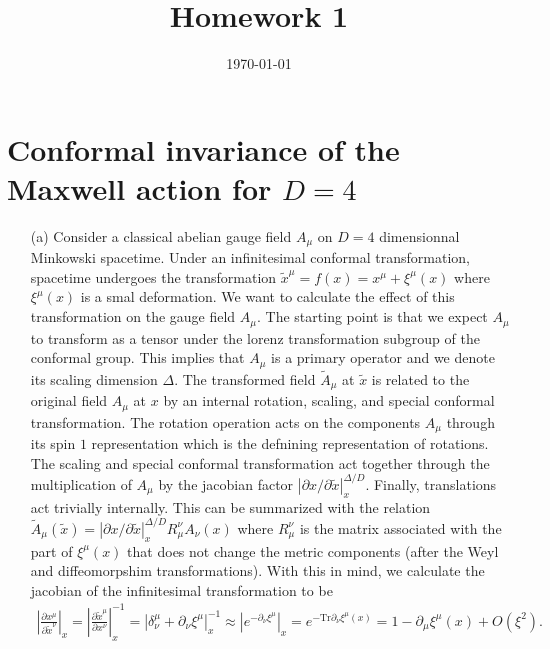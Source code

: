 \documentclass[10pt, a4paper]{article}
\title{Homework 1} %
\author{\PA} %
\date{\today} %
\begin{document}
\maketitlepage

\maketableofcontents


\footnotesize{

\section{Conformal invariance of the Maxwell action for $D=4$}

\begin{enumerate}
  \item[(a)] Consider a classical abelian gauge field $A_\mu$ on $D=4$ dimensionnal Minkowski spacetime. Under an infinitesimal conformal transformation, spacetime undergoes the transformation $\tilde{x}^{\mu} = f(x) = x^{\mu} + \xi^{\mu}(x)$ where $\xi^\mu(x)$ is a smal deformation. We want to calculate the effect of this transformation on the gauge field $A_\mu$. The starting point is that we expect $A_\mu$ to transform as a tensor under the lorenz transformation subgroup of the conformal group. This implies that $A_\mu$ is a primary operator and we denote its scaling dimension $\Delta$. The transformed field $\tilde{A}_\mu$ at $\tilde{x}$ is related to the original field $A_\mu$ at $x$ by an internal rotation, scaling, and special conformal transformation. The rotation operation acts on the components $A_\mu$ through its spin $1$ representation which is the defnining representation of rotations. The scaling and special conformal transformation act together through the multiplication of $A_\mu$ by the jacobian factor $|\partial x/\partial \tilde{x}|_{x}^{\Delta/D}$. Finally, translations act trivially internally. This can be summarized with the relation $\tilde{A}_\mu(\tilde x) = |\partial x/\partial \tilde{x}|_{x}^{\Delta/D} R_{\mu}^{\nu} A_{\nu}(x)$ where $R_{\mu}^{\nu}$ is the matrix associated with the part of $\xi^\mu(x)$ that does not change the metric components (after the Weyl and diffeomorpshim transformations). With this in mind, we calculate the jacobian of the infinitesimal transformation to be 
  \begin{align*}
    \left|\frac{\partial x^\mu }{\partial \tilde{x}^\nu}\right|_{x} = \left|\frac{\partial \tilde{x}^\mu }{\partial x^\nu}\right|_{x}^{-1} = |\delta_\nu^\mu + \partial_\nu \xi^\mu|_{x}^{-1} \approx |e^{-\partial_\nu \xi^\mu}|_{x} = e^{-\text{Tr} \partial_\nu \xi^\mu(x)} = 1- \partial_\mu \xi^\mu(x) + O(\xi^2). 
  \end{align*}

\end{enumerate}}
\end{document}
